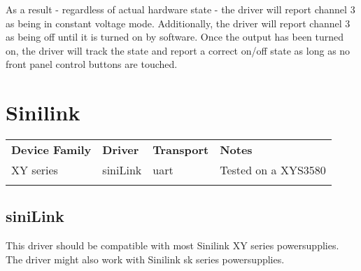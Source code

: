 As a result - regardless of actual hardware state - the driver will report channel 3 as being in constant voltage mode.
Additionally, the driver will report channel 3 as being off until it is turned on by software. Once the output has been
turned on, the driver will track the state and report a correct on/off state as long as no front panel control buttons
are touched.

\section{Sinilink}

\begin{tabularx}{16cm}{lllX}
\thickhline
\textbf{Device Family} & \textbf{Driver} & \textbf{Transport} & \textbf{Notes} \\
\thickhline
XY series & siniLink & uart & Tested on a XYS3580\\
\thickhline
\end{tabularx}

\subsection{siniLink}

This driver should be compatible with most Sinilink XY series powersupplies.
The driver might also work with Sinilink sk series powersupplies.
